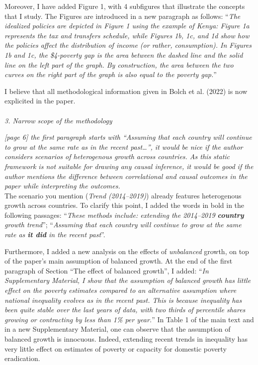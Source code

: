 \documentclass[12pt,english]{article}
\begin{document}
Moreover, I have added Figure 1, with 4 subfigures that illustrate the concepts that I study. The Figures are introduced in a new paragraph as follows: ``\textit{The idealized policies are depicted in Figure 1 using the example of Kenya: Figure 1a represents the tax and transfers schedule, while Figures 1b, 1c, and 1d show how the policies affect the distribution of income (or rather, consumption). In Figures 1b and 1c, the \$4-poverty gap is the area between the dashed line and the solid line on the left part of the graph. By construction, the area between the two curves on the right part of the graph is also equal to the poverty gap.}''

I believe that all methodological information given in Bolch et al. (2022) is now explicited in the paper.
~\\ ~\\

\textit{3.	Narrow scope of the methodology}

\textit{[page 6] the first paragraph starts with “Assuming that each country will continue to grow at the same rate as in the recent past…”, it would be nice if the author considers scenarios of heterogenous growth across countries. As this static framework is not suitable for drawing any causal inference, it would be good if the author mentions the difference between correlational and causal outcomes in the paper while interpreting the outcomes. }~\\

The scenario you mention (\textit{Trend (2014--2019)}) already features heterogenous growth across countries. To clarify this point, I added the words in bold in the following passages: ``\textit{These methods include: extending the 2014--2019 \textbf{country} growth trend}''; ``\textit{Assuming that each country will continue to grow at the same rate as \textbf{it did} in the recent past}''. 

Furthermore, I added a new analysis on the effects of \textit{unbalanced} growth, on top of the paper's main assumption of balanced growth. At the end of the first paragraph of Section ``The effect of balanced growth'', I added: 
``\textit{In Supplementary Material, I show that the assumption of balanced growth has little effect on the poverty estimates compared to an alternative assumption where national inequality evolves as in the recent past. This is because inequality has been quite stable over the last years of data, with two thirds of percentile shares growing or contracting by less than 1\% per year.}'' In Table 1 of the main text and in a new Supplementary Material, one can observe that the assumption of balanced growth is innocuous. Indeed, extending recent trends in inequality has very little effect on estimates of poverty or capacity for domestic poverty eradication. 
\end{document}
